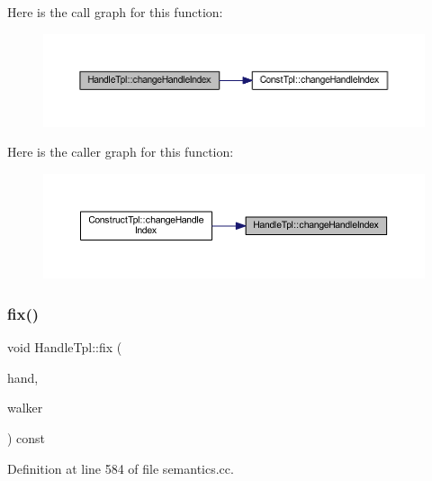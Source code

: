 Here is the call graph for this function\+:
\nopagebreak
\begin{figure}[H]
\begin{center}
\leavevmode
\includegraphics[width=350pt]{class_handle_tpl_acb53d25d53479eff5c054f16a023c2b2_cgraph}
\end{center}
\end{figure}
Here is the caller graph for this function\+:
\nopagebreak
\begin{figure}[H]
\begin{center}
\leavevmode
\includegraphics[width=350pt]{class_handle_tpl_acb53d25d53479eff5c054f16a023c2b2_icgraph}
\end{center}
\end{figure}
\mbox{\label{class_handle_tpl_ad63a0ce0388c46af005d036efc20758f}} 
\subsubsection{\texorpdfstring{fix()}{fix()}}
{\footnotesize\ttfamily void Handle\+Tpl\+::fix (\begin{DoxyParamCaption}\item[{\mbox{\hyperlink{struct_fixed_handle}{Fixed\+Handle}} \&}]{hand,  }\item[{const \mbox{\hyperlink{class_parser_walker}{Parser\+Walker}} \&}]{walker }\end{DoxyParamCaption}) const}



Definition at line 584 of file semantics.\+cc.

